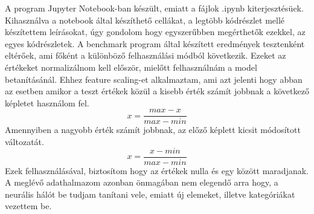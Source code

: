 A program Jupyter Notebook-ban készült, emiatt a fájlok .ipynb kiterjesztésüek. Kihasználva a notebook által készíthető cellákat, a legtöbb kódrészlet mellé készítettem leírásokat, úgy gondolom hogy egyszerűbben megérthetők ezekkel, az egyes kódrészletek.
A benchmark program által készített eredmények tesztenként eltérőek, ami főként a különböző felhasználási módból következik. Ezeket az értékeket normalizálnom kell először, mielőtt felhasználnám a model betanításánál. Ehhez feature scaling-et alkalmaztam, ami azt jelenti hogy abban az esetben amikor a teszt értékek közül a kisebb érték számít jobbnak a következő képletet használom fel. 
\begin{equation}
x = \frac{max-x}{max-min}
\end{equation}
Amennyiben a nagyobb érték számít jobbnak, az előző képlett kicsit módosított változatát.
\begin{equation}
x = \frac{x-min}{max-min}
\end{equation}
Ezek felhasználásával, biztosítom hogy az értékek nulla és egy között maradjanak.
A meglévő adathalmazom azonban önmagában nem elegendő arra hogy, a neurális hálót be tudjam tanítani vele, emiatt új elemeket, illetve kategóriákat vezettem be.
